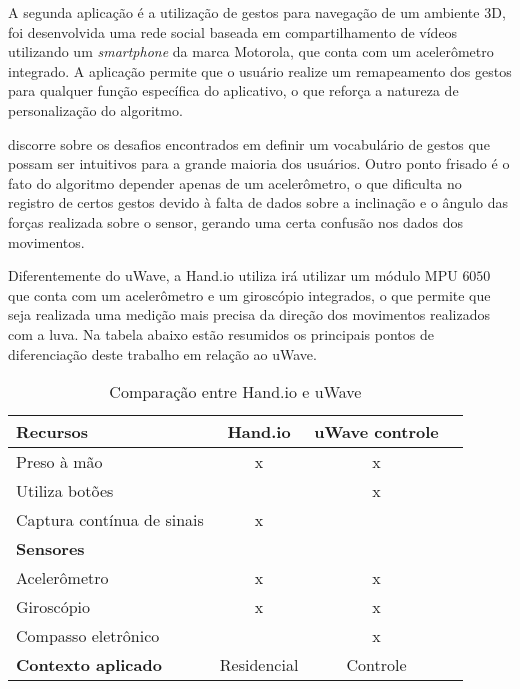 A segunda aplicação é a utilização de gestos para navegação de um ambiente 3D, foi desenvolvida uma rede social baseada em compartilhamento de vídeos utilizando um \textit{smartphone} da marca Motorola, que conta com um acelerômetro integrado. A aplicação permite que o usuário realize um remapeamento dos gestos para qualquer função específica do aplicativo, o que reforça a natureza de personalização do algoritmo.

 discorre sobre os desafios encontrados em definir um vocabulário de gestos que possam ser intuitivos para a grande maioria dos usuários. Outro ponto frisado é o fato do algoritmo depender apenas de um acelerômetro, o que dificulta no registro de certos gestos devido à falta de dados sobre a inclinação e o ângulo das forças realizada sobre o sensor, gerando uma certa confusão nos dados dos movimentos.

Diferentemente do uWave, a Hand.io utiliza irá utilizar um módulo MPU $6050$ \cite{invensense} que conta com um acelerômetro e um giroscópio integrados, o que permite que seja realizada uma medição mais precisa da direção dos movimentos realizados com a luva. Na tabela abaixo estão resumidos os principais pontos de diferenciação deste trabalho em relação ao uWave.

\begin{table}[ht]
	\centering
    \caption{Comparação entre Hand.io e uWave}
    \label{tab:comp_uwave}
	\begin{tabular}{|l|c|c|c|}
    	\hline
		\textbf{Recursos} & \textbf{Hand.io} & \textbf{uWave controle} \\
        \hline
        \hline
        Preso à mão & x & x \\
        \hline
        Utiliza botões &  & x \\
        \hline
        Captura contínua de sinais & x & \\
        \hline
        \hline
        \textbf{Sensores} & & \\
        \hline
        \hline
        Acelerômetro & x & x \\
        \hline
        Giroscópio & x & x \\
        \hline
        Compasso eletrônico & & x \\
        \hline
        \hline
        \textbf{Contexto aplicado} & Residencial & Controle \\
        \hline
	\end{tabular}

\end{table}

